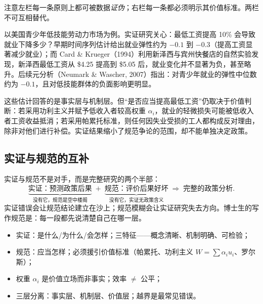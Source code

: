 注意左栏每一条原则上都可被数据\emph{证伪}；右栏每一条都必须明示其价值标准。两栏不可互相替代。

\begin{example}
以美国青少年低技能劳动力市场为例。实证研究关心：最低工资提高 10\% 会导致就业下降多少？早期时间序列估计给出就业弹性约为 $-0.1$ 到 $-0.3$（提高工资显著减少就业）；而 Card \& Krueger（1994）利用新泽西与宾州快餐店的自然实验发现，新泽西最低工资从 \$4.25 提高到 \$5.05 后，就业变化并不显著为负，甚至略升。后续元分析（Neumark \& Wascher, 2007）指出：对青少年就业的弹性中位数约为 $-0.1$，且对低技能群体的负面影响更明显。

这些估计回答的是事实层与机制层。但“是否应当提高最低工资”仍取决于价值判断：若采用功利主义并赋予低收入者较高权重 $\alpha_i$，就业的轻微损失可能被低收入者工资收益抵消；若采用帕累托标准，则任何因失业受损的工人都构成反对理由，除非对他们进行补偿。实证结果缩小了规范争论的范围，却不能单独决定政策。
\end{example}

\subsection{实证与规范的互补}

实证与规范不是对手，而是完整研究的两个半部：
\[
\underbrace{\text{实证：预测政策后果}}_{\text{没有它，规范是空中楼阁}}
\;+\;
\underbrace{\text{规范：评价后果好坏}}_{\text{没有它，实证无政策含义}}
\;\Longrightarrow\; \text{完整的政策分析}.
\]
实证错误会让规范结论建立在沙上；规范模糊会让实证研究失去方向。博士生的写作规范是：每一段都先说清楚自己在哪一层。

\begin{itemize}
  \item 实证：是什么/为什么/会怎样；三特征——概念清晰、机制明确、可检验；
  \item 规范：应当怎样；必须援引价值标准（帕累托、功利主义 $W=\sum\alpha_i u_i$、罗尔斯）；
  \item 权重 $\alpha_i$ 是价值立场而非事实；效率 $\neq$ 公平；
  \item 三层分离：事实层、机制层、价值层；越界是最常见错误。
\end{itemize}
